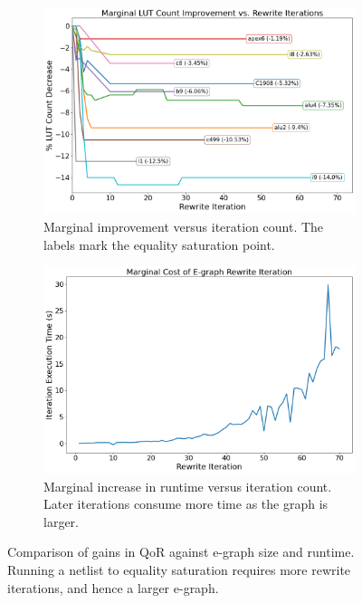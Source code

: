 \begin{figure}
    \begin{subfigure}{0.47\textwidth}
        \centering
        \includegraphics[width=\textwidth]{img/improvement.png}
        \caption{Marginal improvement versus iteration count. The labels mark the equality saturation point.}\label{fig:marginal:improvement}
    \end{subfigure}
    \hfill\vspace{4mm}
    \begin{subfigure}{0.47\textwidth}
        \centering
        \includegraphics[width=\textwidth]{img/runtime_derivative.png}
        \caption{Marginal increase in runtime versus iteration count. Later iterations consume more time as the graph is larger.}\label{fig:marginal:runtime}
    \end{subfigure}
    \caption{Comparison of gains in QoR against e-graph size and runtime. Running a netlist to equality saturation requires more rewrite iterations, and hence a larger e-graph.}\label{fig:marginal}
\end{figure}

